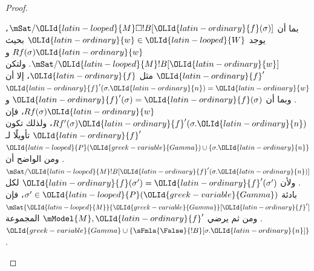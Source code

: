 \documentclass[../../../include/open-logic-section]{subfiles}
\begin{document}
\begin{proof}
\begin{enumerate}
{{  بما أن $\mSat/{\OLId{latin-looped}{M}}{\Box !B}[\OLId{latin-ordinary}{f}(\sigma)]$، يوجد $\OLId{latin-ordinary}{w} \in \OLId{latin-looped}{W}$ بحيث
  $Rf(\sigma)\OLId{latin-ordinary}{w}$ و$\mSat/{\OLId{latin-looped}{M}}{!B}[\OLId{latin-ordinary}{w}]$. ولتكن $\OLId{latin-ordinary}{f}'$ مثل $\OLId{latin-ordinary}{f}$، إلا أن
  $\OLId{latin-ordinary}{f}'(\sigma.\OLId{latin-ordinary}{n}) = \OLId{latin-ordinary}{w}$. وبما أن $\OLId{latin-ordinary}{f}'(\sigma) = \OLId{latin-ordinary}{f}(\sigma)$ و
  $Rf(\sigma)\OLId{latin-ordinary}{w}$، فإن $Rf'(\sigma)\OLId{latin-ordinary}{f}'(\sigma.\OLId{latin-ordinary}{n})$، ولذلك تكون $\OLId{latin-ordinary}{f}'$
  تأويلًا لـ$\OLId{latin-looped}{P}(\OLId{greek-variable}{Gamma}) \cup \{\sigma.\OLId{latin-ordinary}{n}\}$. ومن الواضح أن
  $\mSat/{\OLId{latin-looped}{M}}{!B}[\OLId{latin-ordinary}{f}'(\sigma.\OLId{latin-ordinary}{n})]$. ولأن $\OLId{latin-ordinary}{f}(\sigma') = \OLId{latin-ordinary}{f}'(\sigma')$ لكل
  بادئة $\sigma' \in \OLId{latin-looped}{P}(\OLId{greek-variable}{Gamma})$، فإن $\mSat{\OLId{latin-looped}{M}}{\OLId{greek-variable}{Gamma}}[\OLId{latin-ordinary}{f}']$. ومن ثم
  يرضي $\mModel{M}, \OLId{latin-ordinary}{f}'$ المجموعة $\OLId{greek-variable}{Gamma} \cup
  \{\sFmla{\False}{!B}[\sigma.\OLId{latin-ordinary}{n}]\}$.}
  }{}

\end{enumerate}
\end{proof}
\end{document}
